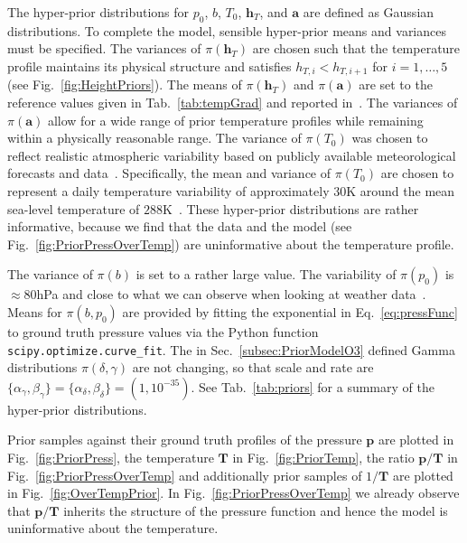 \begin{mccorrection} 
The hyper-prior distributions for $p_0$, $b$, $T_0$, $\bm{h}_T$, and $\bm{a}$ are defined as Gaussian distributions. To complete the model, sensible hyper-prior means and variances must be specified.
The variances of $\pi(\bm{h}_T)$ are chosen such that the temperature profile maintains its physical structure and satisfies $h_{T,i} < h_{T,i+1}$ for $i=1,\ldots,5$ (see Fig.~\ref{fig:HeightPriors}).
The means of $\pi(\bm{h}_T)$ and $\pi(\bm{a})$ are set to the reference values given in Tab.~\ref{tab:tempGrad} and reported in~\cite[Tab.~5]{atmosphere1976us}. The variances of $\pi(\bm{a})$ allow for a wide range of prior temperature profiles while remaining within a physically reasonable range.
The variance of $\pi(T_0)$ was chosen to reflect realistic atmospheric variability based on publicly available meteorological forecasts and data~\cite{meteoblue,ZoomEarth}. 
Specifically, the mean and variance of $\pi(T_0)$ are chosen to represent a daily temperature variability of approximately $30$K around the mean sea-level temperature of $288$K~\cite{atmosphere1976us}.
These hyper-prior distributions are rather informative, because we find that the data and the model (see Fig.~\ref{fig:PriorPressOverTemp}) are uninformative about the temperature profile.

The variance of $\pi(b)$ is set to a rather large value.
The variability of $\pi(p_0)$ is $\approx 80$hPa and close to what we can observe when looking at weather data~\cite{meteoblue,ZoomEarth}.
Means for $\pi(b ,p_0)$ are provided by fitting the exponential in Eq.~\ref{eq:pressFunc} to ground truth pressure values via the Python function \texttt{scipy.optimize.curve\_fit}.
The in Sec.~\ref{subsec:PriorModelO3} defined Gamma distributions $\pi(\delta,\gamma)$ are not changing, so that scale and rate are $\{  \alpha_\gamma, \beta_\gamma\}  = \{ \alpha_\delta ,\beta_\delta\} = (1,10^{-35})$.
See Tab.~\ref{tab:priors} for a summary of the hyper-prior distributions.
\end{mccorrection} 


Prior samples against their ground truth profiles of the pressure $\bm{p}$ are plotted in Fig.~\ref{fig:PriorPress}, the temperature $\bm{T}$ in Fig.~\ref{fig:PriorTemp}, the ratio $\bm{p}/\bm{T}$ in Fig.~\ref{fig:PriorPressOverTemp} and additionally prior samples of $1/\bm{T}$ are plotted in Fig.~\ref{fig:OverTempPrior}.
In Fig.~\ref{fig:PriorPressOverTemp} we already observe that $\bm{p}/\bm{T}$ inherits the structure of the pressure function and hence the model is uninformative about the temperature.
\clearpage
